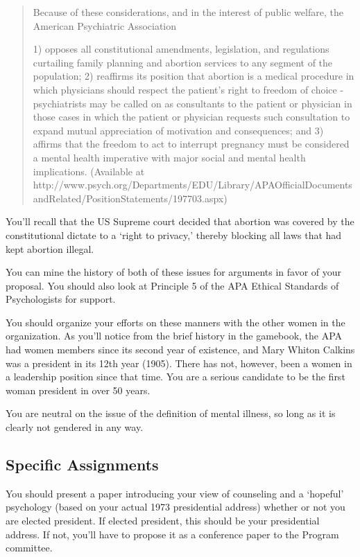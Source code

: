 \begin{refsection}
\begin{quote}
Because of these considerations, and in the interest of public welfare, the American Psychiatric Association

1) opposes all constitutional amendments, legislation, and regulations curtailing family planning and abortion services to any segment of the population; 2) reaffirms its position that abortion is a medical procedure in which physicians should respect the patient's right to freedom of choice - psychiatrists may be called on as consultants to the patient or physician in those cases in which the patient or physician requests such consultation to expand mutual appreciation of motivation and consequences; and 3) affirms that the freedom to act to interrupt pregnancy must be considered a mental health imperative with major social and mental health implications.⁠ (Available at http:\slash \slash www.psych.org\slash Departments\slash EDU\slash Library\slash APAOfficialDocumentsandRelated\slash PositionStatements\slash 197703.aspx)
\end{quote}

You'll recall that the US Supreme court decided that abortion was covered by the constitutional dictate to a `right to privacy,' thereby blocking all laws that had kept abortion illegal.

You can mine the history of both of these issues for arguments in favor of your proposal. You should also look at Principle 5 of the APA Ethical Standards of Psychologists for support.

You should organize your efforts on these manners with the other women in the organization. As you'll notice from the brief history in the gamebook, the APA had women members since its second year of existence, and Mary Whiton Calkins was a president in its 12th year (1905). There has not, however, been a women in a leadership position since that time. You are a serious candidate to be the first woman president in over 50 years.

You are neutral on the issue of the definition of mental illness, so long as it is clearly not gendered in any way.

\subsection{Specific Assignments}
\label{specificassignments}

You should present a paper introducing your view of counseling and a `hopeful' psychology (based on your actual 1973 presidential address) whether or not you are elected president. If elected president, this should be your presidential address. If not, you'll have to propose it as a conference paper to the Program committee.


\end{refsection}
